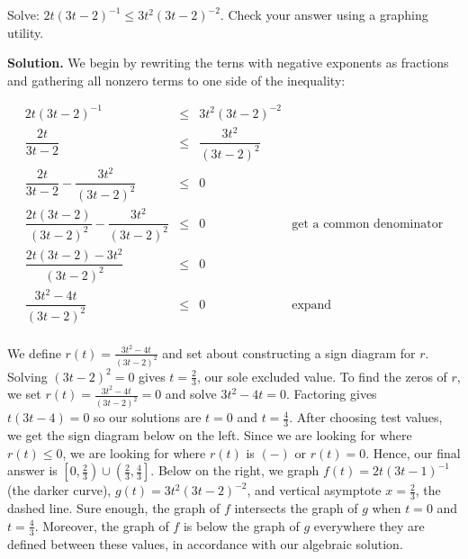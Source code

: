 \documentclass{ximera}
\begin{document}
\begin{example} \label{morerationalineq} Solve:  $2t (3t-2)^{-1} \leq 3t^2 (3t-2)^{-2}$. Check your answer using a graphing utility.


{\bf Solution.} We begin by rewriting the terns with negative exponents as fractions and gathering all nonzero terms to one side of the inequality:

\[ \begin{array}{rclr}

2t (3t-2)^{-1} &  \leq & 3t^2 (3t-2)^{-2} & \\ [10pt]

\dfrac{2t}{3t-2} & \leq & \dfrac{3t^2}{(3t-2)^2} & \\ [10pt]


\dfrac{2t}{3t-2}  - \dfrac{3t^2}{(3t-2)^2}  & \leq & 0 &  \\ [10pt]

\dfrac{2t(3t-2)}{(3t-2)^2}  - \dfrac{3t^2}{(3t-2)^2}  & \leq & 0  & \text{get a common denominator} \\ [10pt]

\dfrac{2t(3t-2) - 3t^2}{(3t-2)^2}  & \leq & 0  &\\ [10pt]

\dfrac{3t^2-4t}{(3t-2)^2}  & \leq & 0  & \text{expand} \\ [10pt]

\end{array} \]

We define $r(t) = \frac{3t^2-4t}{(3t-2)^2}$ and set about constructing a sign diagram for $r$.  Solving  $(3t-2)^2 = 0$ gives $t = \frac{2}{3}$, our sole excluded value.  To find the zeros of $r$, we set $r(t) = \frac{3t^2-4t}{(3t-2)^2} = 0$ and solve $3t^2-4t = 0$.  Factoring gives $t(3t-4) = 0$ so our solutions are $t = 0$ and $t = \frac{4}{3}$. After choosing test values, we  get the sign diagram below on the left.   Since we are looking for where $r(t) \leq 0$, we are looking for where $r(t)$ is $(-)$ or $r(t) = 0$. Hence,  our final answer is $\left[0, \frac{2}{3} \right) \cup \left(\frac{2}{3}, \frac{4}{3} \right]$.  Below on the right,  we graph $f(t) = 2t(3t-1)^{-1}$ (the darker curve),   $g(t) = 3t^2(3t-2)^{-2}$, and  vertical asymptote $x = \frac{2}{3}$, the dashed line.  Sure enough, the graph of $f$ intersects the graph of $g$ when $t = 0$ and $t = \frac{4}{3}$.  Moreover, the graph of $f$ is below the graph of $g$ everywhere they are defined between these values, in accordance with our algebraic solution.




\end{example}
\end{document}

